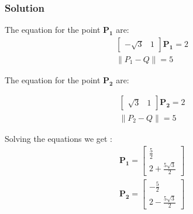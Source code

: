 \documentclass{beamer}
\begin{document}
\begin{frame}
\frametitle{Solution}
The equation for the point $\mathbf{P_1}$ are:
\begin{align}
\begin{bmatrix}-\sqrt{3} & 1\end{bmatrix}\mathbf{P_1} = 2\\
\lVert P_1 - Q \rVert = 5
\end{align}

The equation for the point $\mathbf{P_2}$ are:

\begin{align}
\begin{bmatrix}\sqrt{3} & 1\end{bmatrix}\mathbf{P_2} = 2\\
\lVert P_2 - Q \rVert = 5
\end{align}

Solving the equations we get :
\begin{align}
   \mathbf{P_1} = \begin{bmatrix}\frac{5}{2} \\ 2+\frac{5\sqrt{3}}{2}\end{bmatrix} \\
    \mathbf{P_2} = \begin{bmatrix}-\frac{5}{2} \\ 2-\frac{5\sqrt{3}}{2}\end{bmatrix}
\end{align}
\end{frame}
\end{document}
